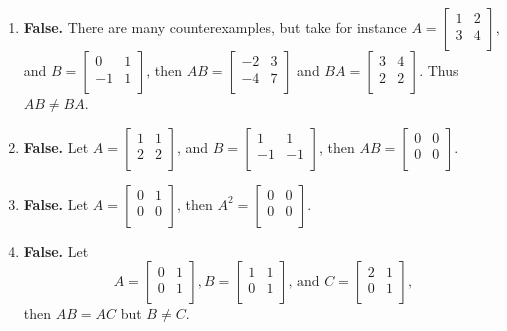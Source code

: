 \documentclass[12pt,letterpaper]{article}
\begin{document}
\begin{enumerate}
\Answer   

\begin{enumerate}

\item {\bf False.} There are many counterexamples, but take for instance $A=\begin{bmatrix} 1 & 2\\ 3 & 4\\ \end{bmatrix}$, and $B=\begin{bmatrix} 0 & 1\\ -1 & 1\\ \end{bmatrix}$, then $AB=\begin{bmatrix} -2 & 3\\ -4 & 7\\ \end{bmatrix}$ and $BA=\begin{bmatrix} 3 & 4\\ 2 & 2\\ \end{bmatrix}$. Thus $AB\neq BA$.

\item {\bf False.} Let $A=\begin{bmatrix} 1 & 1\\ 2 & 2\\ \end{bmatrix}$, and $B=\begin{bmatrix} 1 & 1\\ -1 & -1\\ \end{bmatrix}$, then $AB=\begin{bmatrix} 0 & 0\\ 0 & 0\\ \end{bmatrix}$.

\item {\bf False.} Let $A=\begin{bmatrix} 0 & 1\\ 0 & 0\\ \end{bmatrix}$, then $A^2=\begin{bmatrix} 0 & 0\\ 0 & 0\\ \end{bmatrix}$.

\item {\bf False.} Let $$A=\begin{bmatrix} 0 & 1\\ 0 & 1\\ \end{bmatrix}, B=\begin{bmatrix} 1 & 1\\ 0 & 1\\ \end{bmatrix}\text{, and  } C=\begin{bmatrix} 2 & 1\\ 0 & 1\\ \end{bmatrix},$$  then $AB=AC$ but $B\neq C$.


\end{enumerate}
\end{enumerate}
\end{document}
